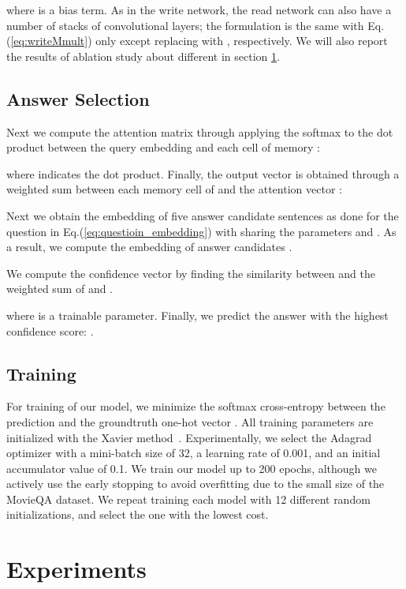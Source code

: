 \documentclass[10pt,twocolumn,letterpaper]{article}
\theoremstyle{nonumberplain}
\begin{document}
\noindent where  is a bias term.
As in the write network, the read network can also have a  number of stacks of convolutional layers; the formulation is the same with Eq.(\ref{eq:writeMmult}) only except replacing   with , respectively.
We will also report the results of ablation study about different  in section \ref{sec:experiments}.


\subsection{Answer Selection}
\label{sec:answer_selection}

Next we compute the attention matrix  through applying the softmax to the dot product between the query embedding  and each cell of memory :

\noindent where  indicates the dot product. 
Finally, the output vector  is obtained through a weighted sum between each memory cell of  and the attention vector :

Next we obtain the embedding of five answer candidate sentences  as done for the question in Eq.(\ref{eq:questioin_embedding}) with sharing the parameters  and . As a result, we compute the embedding of answer candidates . 

We compute the confidence vector  by finding the similarity between  and the weighted sum of  and .

where  is a trainable parameter.
Finally, we predict the answer  with the highest confidence score: .


\subsection{Training}
\label{sec:training}

For training of our model, we minimize the softmax cross-entropy between the prediction  and the groundtruth one-hot vector .
All training parameters are initialized with the Xavier method~\cite{glorot2010understanding}.
Experimentally, we select the Adagrad~\cite{duchi2011adaptive} optimizer with a mini-batch size of 32, a learning rate of 0.001, and an initial accumulator value of 0.1.
We train our model up to 200 epochs, although we actively use the early stopping to avoid overfitting due to the small size of the MovieQA dataset.
We repeat training each model with 12 different random initializations, and select the one with the lowest cost. 


\section{Experiments}
\label{sec:experiments}
\end{document}
